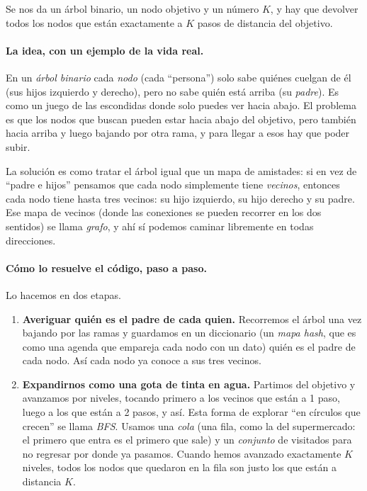 
Se nos da un árbol binario, un nodo objetivo y un número $K$, y hay que devolver todos los nodos que están exactamente a $K$ pasos de distancia del objetivo.

\paragraph{La idea, con un ejemplo de la vida real.} En un \emph{árbol binario} cada \emph{nodo} (cada ``persona'') solo sabe quiénes cuelgan de él (sus hijos izquierdo y derecho), pero no sabe quién está arriba (su \emph{padre}). Es como un juego de las escondidas donde solo puedes ver hacia abajo. El problema es que los nodos que buscan pueden estar hacia abajo del objetivo, pero también hacia arriba y luego bajando por otra rama, y para llegar a esos hay que poder subir.

La solución es como tratar el árbol igual que un mapa de amistades: si en vez de ``padre e hijos'' pensamos que cada nodo simplemente tiene \emph{vecinos}, entonces cada nodo tiene hasta tres vecinos: su hijo izquierdo, su hijo derecho y su padre. Ese mapa de vecinos (donde las conexiones se pueden recorrer en los dos sentidos) se llama \emph{grafo}, y ahí sí podemos caminar libremente en todas direcciones.

\paragraph{Cómo lo resuelve el código, paso a paso.} Lo hacemos en dos etapas.
\begin{enumerate}
  \item \textbf{Averiguar quién es el padre de cada quien.} Recorremos el árbol una vez bajando por las ramas y guardamos en un diccionario (un \emph{mapa hash}, que es como una agenda que empareja cada nodo con un dato) quién es el padre de cada nodo. Así cada nodo ya conoce a sus tres vecinos.
  \item \textbf{Expandirnos como una gota de tinta en agua.} Partimos del objetivo y avanzamos por niveles, tocando primero a los vecinos que están a 1 paso, luego a los que están a 2 pasos, y así. Esta forma de explorar ``en círculos que crecen'' se llama \emph{BFS}. Usamos una \emph{cola} (una fila, como la del supermercado: el primero que entra es el primero que sale) y un \emph{conjunto} de visitados para no regresar por donde ya pasamos. Cuando hemos avanzado exactamente $K$ niveles, todos los nodos que quedaron en la fila son justo los que están a distancia $K$.
\end{enumerate}

